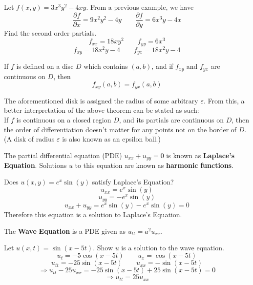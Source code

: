 \begin{eg}
    Let \(f(x,y)=3x^3 y^2 -4xy\). From a previous example, we have 
    \[
        \frac{\partial f}{\partial x}=9x^2 y^2 -4y\qquad \frac{\partial f}{\partial y}=6x^3 y-4x
    \]
    Find the second order partials. 
    \[
        f_{xx}=18xy^2\qquad f_{yy}=6x^3 
    \]
    \[
        f_{xy}=18x^2 y-4\qquad f_{yx} =18x^2 y-4
    \]
\end{eg}
\begin{theorem}\label{Clairaut}
    If \(f\) is defined on a disc \(D\) which contains \((a,b)\), and if \(f_{xy} \) and \(f_{yx} \) are continuous on \(D\), then
    \[
        f_{xy} (a,b)=f_{yx}(a,b) 
    \]
\end{theorem}
\begin{remark}
    The aforementioned disk is assigned the radius of some arbitrary \(\varepsilon \). From this, a better interpretation of the above theorem can be stated as such:\\
    If \(f\) is continuous on a closed region \(D\), and its partials are continuous on \(D\), then the order of differentiation doesn't matter for any points not on the border of \(D\).\\
    (A disk of radius \(\varepsilon \) is also known as an epsilon ball.)
\end{remark}
\begin{definition}
    The partial differential equation (PDE) \(u_{xx}+u_{yy}=0  \) is known as \textbf{Laplace's} \textbf{Equation}. Solutions \(u\) to this equation are known as \textbf{harmonic} \textbf{functions}.
\end{definition}
\begin{eg}
    Does \(u(x,y)=e^x \sin (y)\) satisfy Laplace's Equation?
    \[
        u_{xx}=e^x\sin(y) 
    \]
    \[
        u_{yy}=-e^x \sin (y) 
    \]
    \[u_{xx}+u_{yy}=e^{x}\sin (y)-e^x \sin (y)=0   \]
Therefore this equation is a solution to Laplace's Equation.
\end{eg}
\begin{definition}
    The \textbf{Wave} \textbf{Equation} is a PDE given as \(u_{tt}=a^2 u_{xx}  \).
\end{definition}
\begin{eg}
    Let \(u(x,t)=\sin (x-5t)\). Show \(u\) is a solution to the wave equation.
    \[
        u_{t}=-5\cos (x-5t)\qquad u_x =\cos (x-5t) 
    \]
    \[
        u_{tt}=-25\sin (x-5t)\qquad u_{xx}=-\sin (x-5t)  
    \]
    \[
        \Longrightarrow u_{tt}-25u_{xx}=-25\sin (x-5t)+25\sin (x-5t)=0  
    \]
    \[
        \Longrightarrow u_{tt}=25u_{xx}  
    \]
\end{eg}
